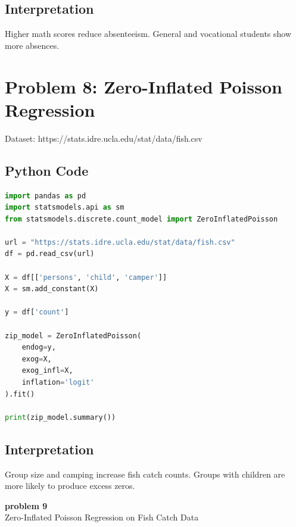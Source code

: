 \documentclass[12pt]{article}
\begin{document}
\subsection*{Interpretation}

Higher math scores reduce absenteeism.
General and vocational students show more absences.

\newpage

\section*{Problem 8: Zero-Inflated Poisson Regression}

Dataset:
https://stats.idre.ucla.edu/stat/data/fish.csv

\subsection*{Python Code}

\begin{lstlisting}[language=Python]
import pandas as pd
import statsmodels.api as sm
from statsmodels.discrete.count_model import ZeroInflatedPoisson

url = "https://stats.idre.ucla.edu/stat/data/fish.csv"
df = pd.read_csv(url)

X = df[['persons', 'child', 'camper']]
X = sm.add_constant(X)

y = df['count']

zip_model = ZeroInflatedPoisson(
    endog=y,
    exog=X,
    exog_infl=X,
    inflation='logit'
).fit()

print(zip_model.summary())
\end{lstlisting}

\subsection*{Interpretation}

Group size and camping increase fish catch counts.
Groups with children are more likely to produce excess zeros.








\newpage

\begin{center}
    {\LARGE \textbf{ problem 9}}\\[0.3cm]
    {\large Zero-Inflated Poisson Regression on Fish Catch Data}
\end{center}
\end{document}
